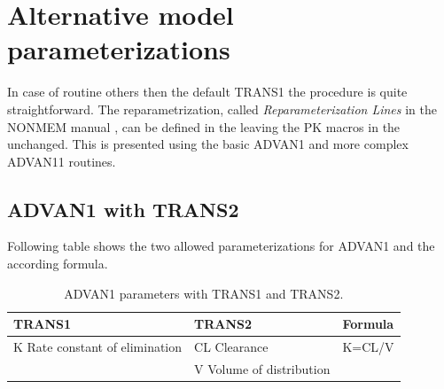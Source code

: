 %
%
%


%


\section{Alternative model parameterizations}

In case of routine others then the default TRANS1 the procedure is quite straightforward. 
The reparametrization, called \emph{Reparameterization Lines} in the NONMEM manual
\cite{NONMEM:2009}, can be defined in the  leaving the PK macros in the 
 unchanged. This is presented using the basic ADVAN1 and more 
complex ADVAN11 routines.

\subsection{ADVAN1 with TRANS2}
Following table shows the two allowed parameterizations for ADVAN1 and the according formula. 
\begin{table}[ht]
\begin{center}
\begin{tabular*}{.8\textwidth}{@{\extracolsep{\fill} } lll}
  \hline
  \hline
  TRANS1								& TRANS2						& Formula \\
  \hline
K Rate constant of elimination				& CL Clearance 					& K=CL/V \\
									& V Volume of distribution				& \\
\end{tabular*}
\caption{ADVAN1 parameters with TRANS1 and TRANS2.}
\end{center}
\end{table}

